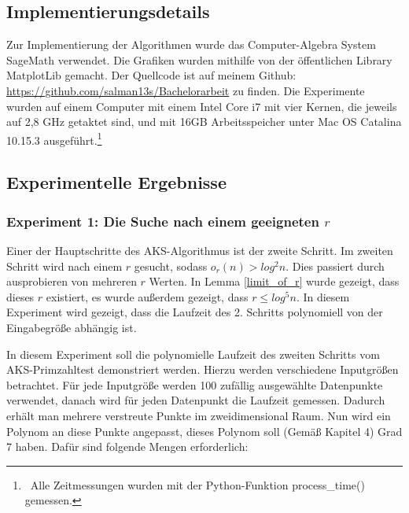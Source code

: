 \documentclass[12pt,oneside]{article}
\theoremstyle{remark}
\theoremstyle{definition}
\begin{document}
\subsection{Implementierungsdetails}
Zur Implementierung der Algorithmen wurde das Computer-Algebra System SageMath verwendet. Die Grafiken wurden mithilfe von der öffentlichen Library MatplotLib gemacht. Der Quellcode ist auf meinem Github: \url{https://github.com/salman13s/Bachelorarbeit} zu finden. Die Experimente wurden auf einem Computer mit einem Intel Core i7 mit vier Kernen, die jeweils auf 2,8 GHz getaktet sind, und mit 16GB Arbeitsspeicher unter Mac OS Catalina 10.15.3 ausgeführt.\footnote{$\,$ Alle Zeitmessungen wurden mit der Python-Funktion process\_time() gemessen.}

\subsection{Experimentelle Ergebnisse}

\subsubsection{Experiment 1: Die Suche nach einem geeigneten $r$}
Einer der Hauptschritte des AKS-Algorithmus ist der zweite Schritt. Im zweiten Schritt wird nach einem $r$ gesucht, sodass $o_r(n) > log^2 n$. Dies passiert durch ausprobieren von mehreren $r$ Werten. In Lemma \ref{limit_of_r} wurde gezeigt, dass dieses $r$ existiert, es wurde außerdem gezeigt, dass $r \leq log^5 n$. In diesem Experiment wird gezeigt, dass die Laufzeit des 2. Schritts polynomiell von der Eingabegröße abhängig ist.

\textbf{}\newline
In diesem Experiment soll die polynomielle Laufzeit des zweiten Schritts vom AKS-Primzahltest demonstriert werden. Hierzu werden verschiedene Inputgrößen betrachtet. Für jede Inputgröße werden 100 zufällig ausgewählte Datenpunkte verwendet, danach wird für jeden Datenpunkt die Laufzeit gemessen. Dadurch erhält man mehrere verstreute Punkte im zweidimensional Raum. Nun wird ein Polynom an diese Punkte angepasst, dieses Polynom soll (Gemäß Kapitel 4) Grad 7 haben. Dafür sind folgende Mengen erforderlich:
\end{document}
